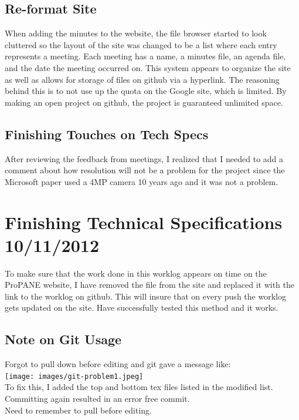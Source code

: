 \documentclass[]{article}
\begin{document}
		\subsection{Re-format Site}
			When adding the minutes to the website, the file browser started to look cluttered so the layout of the site was changed to be a list where each entry represents a meeting. Each meeting has a name, a minutes file, an agenda file, and the date the meeting occurred on. This system appears to organize the site as well as allows for storage of files on github via a hyperlink. The reasoning behind this is to not use up the quota on the Google site, which is limited. By making an open project on github, the project is guaranteed unlimited space. 
			
		\subsection{Finishing Touches on Tech Specs}
			After reviewing the feedback from meetings, I realized that I needed to add a comment about how resolution will not be a problem for the project since the Microsoft paper used a 4MP camera 10 years ago and it was not a problem.
		
	\section{Finishing Technical Specifications 10/11/2012}
		To make sure that the work done in this worklog appears on time on the ProPANE website, I have removed the file from the site and replaced it with the link to the worklog on github. This will insure that on every push the worklog gets updated on the site. Have successfully tested this method and it works.\\
		
		\subsection{Note on Git Usage}
			Forgot to pull down before editing and git gave a message like:\\
			\texttt{[image: images/git-problem1.jpeg]}\\
			To fix this, I added the top and bottom tex files listed in the modified list. Committing again resulted in an error free commit.\\
			Need to remember to pull before editing. 
			
\end{document}
